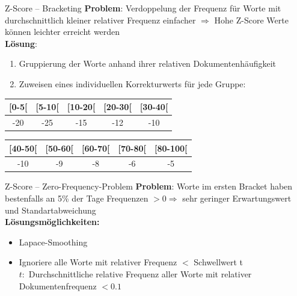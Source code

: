 \documentclass{beamer}
\begin{document}
\begin{frame}{Z-Score – Bracketing}
	\textbf{Problem}: Verdoppelung der Frequenz für Worte mit durchschnittlich kleiner relativer Frequenz einfacher
	$\Rightarrow$ Hohe Z-Score Werte können leichter erreicht werden \\
	\textbf{Lösung}: 
	\begin{enumerate}
		\item Gruppierung der Worte anhand ihrer relativen Dokumentenhäufigkeit 
		\item Zuweisen eines individuellen Korrekturwerts für jede Gruppe:
	\end{enumerate}
	\begin{center}
		\begin{tabular}{|c|c|c|c|c|}
			{[}0-5{[} & {[}5-10{[} & {[}10-20{[} & {[}20-30{[} & {[}30-40{[} \\
			\hline
			-20 & -25 & -15 & -12 & -10
		\end{tabular}
		
		\begin{tabular}{|c|c|c|c|c|}
			{[}40-50{[} & {[}50-60{[} & {[}60-70{[} & {[}70-80{[} & {[}80-100{[} \\
			\hline
			-10 & -9 & -8 & -6 & -5
		\end{tabular}	
	\end{center}		
\end{frame}

\begin{frame}{Z-Score – Zero-Frequency-Problem}
	\textbf{Problem}: Worte im ersten Bracket haben bestenfalls an 5\% der Tage Frequenzen $> 0 \Rightarrow$ sehr geringer 			Erwartungswert und Standartabweichung \\

	\textbf{Lösungsmöglichkeiten:}
	\begin{itemize}
		\item Lapace-Smoothing
		\item Ignoriere alle Worte mit relativer Frequenz $<$ Schwellwert t \\
		$t:$ Durchschnittliche relative Frequenz aller Worte mit relativer Dokumentenfrequenz $<0.1$
	\end{itemize}
\end{frame}
\end{document}
